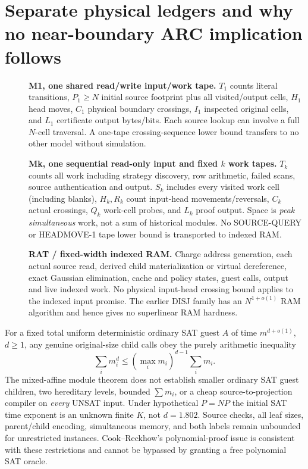 \documentclass[11pt]{article}
\begin{document}
\section{Separate physical ledgers and why no near-boundary ARC implication follows}
\begin{description}
\item[] \textbf{M1, one shared read/write input/work tape.} $T_1$ counts literal transitions, $P_1\ge N$ initial source footprint plus all visited/output cells, $H_1$ head moves, $C_1$ physical boundary crossings, $I_1$ inspected original cells, and $L_1$ certificate output bytes/bits. Each source lookup can involve a full $N$-cell traversal. A one-tape crossing-sequence lower bound transfers to no other model without simulation.
\item[] \textbf{Mk, one sequential read-only input and fixed $k$ work tapes.} $T_k$ counts all work including strategy discovery, row arithmetic, failed scans, source authentication and output. $S_k$ includes every visited work cell (including blanks), $H_k,R_k$ count input-head movements/reversals, $C_k$ actual crossings, $Q_k$ work-cell probes, and $L_k$ proof output. Space is \emph{peak simultaneous} work, not a sum of historical modules. No SOURCE-QUERY or HEADMOVE-1 tape lower bound is transported to indexed RAM.
\item[] \textbf{RAT / fixed-width indexed RAM.} Charge address generation, each actual source read, derived child materialization or virtual dereference, exact Gaussian elimination, cache and policy states, guest calls, output and live indexed work. No physical input-head crossing bound applies to the indexed input promise. The earlier DISJ family has an $N^{1+o(1)}$ RAM algorithm and hence gives no superlinear RAM hardness.
\end{description}
For a fixed total uniform deterministic ordinary SAT guest $A$ of time $m^{d+o(1)}$, $d\ge1$, any genuine original-size child calls obey the purely arithmetic inequality
\[
\sum_i m_i^d\le (\max_i m_i)^{d-1}\sum_i m_i.
\]
The mixed-affine module theorem does not establish smaller ordinary SAT guest children, two hereditary levels, bounded $\sum m_i$, or a cheap source-to-projection compiler on \emph{every} UNSAT input. Under hypothetical $P=NP$ the initial SAT time exponent is an unknown finite $K$, not $d=1.802$. Source checks, all leaf sizes, parent/child encoding, simultaneous memory, and both labels remain unbounded for unrestricted instances. Cook--Reckhow's polynomial-proof issue is consistent with these restrictions and cannot be bypassed by granting a free polynomial SAT oracle.
\end{document}
